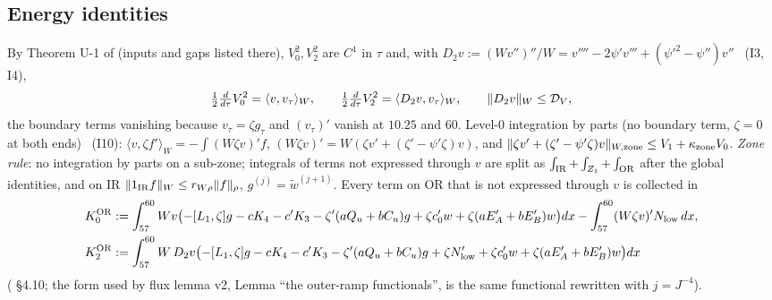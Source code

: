 \documentclass[11pt]{article}
\begin{document}
\subsection{Energy identities}\label{EI:sec:id}
By Theorem U-1 of  (inputs and gaps listed there), $V_0^2,V_2^2$ are $C^1$ in $\tau$ and, with $D_2v:=(Wv'')''/W=v''''-2\psi'v'''+(\psi'^2-\psi'')v''$ \tS\ (I3, I4),
\[
\tfrac12\tfrac{d}{d\tau}V_0^2=\langle v,v_\tau\rangle_W,\qquad\tfrac12\tfrac{d}{d\tau}V_2^2=\langle D_2v,v_\tau\rangle_W,\qquad\|D_2v\|_W\le\mathcal D_V ,
\]
the boundary terms vanishing because $v_\tau=\zeta g_\tau$ and $(v_\tau)'$ vanish at $10.25$ and $60$. Level-0 integration by parts (no boundary term, $\zeta=0$ at both ends) \tS\ (I10): $\langle v,\zeta f'\rangle_W=-\int(W\zeta v)'f$, $(W\zeta v)'=W(\zeta v'+(\zeta'-\psi'\zeta)v)$, and $\|\zeta v'+(\zeta'-\psi'\zeta)v\|_{W,\rm zone}\le V_1+\kappa_{\rm zone}V_0$. \emph{Zone rule}: no integration by parts on a sub-zone; integrals of terms not expressed through $v$ are split as $\int_{\rm IR}+\int_{Z_1}+\int_{\mathrm{OR}}$ after the global identities, and on IR $\|1_{\rm IR}f\|_W\le r_{W\rho}\|f\|_\rho$, $g^{(j)}=\tilde w^{(j+1)}$. Every term on OR that is not expressed through $v$ is collected in
\begin{align*}
K_0^{\mathrm{OR}}&:=\int_{57}^{60}Wv\bigl(-[L_1,\zeta]g-cK_4-c'K_3-\zeta'(aQ_u+bC_u)g+\zeta c_0'w+\zeta(aE_A'+bE_B')w\bigr)dx-\int_{57}^{60}(W\zeta v)'N_{\rm low}\,dx,\\
K_2^{\mathrm{OR}}&:=\int_{57}^{60}W\,D_2v\bigl(-[L_1,\zeta]g-cK_4-c'K_3-\zeta'(aQ_u+bC_u)g+\zeta N_{\rm low}'+\zeta c_0'w+\zeta(aE_A'+bE_B')w\bigr)dx
\end{align*}
( \S4.10; the form used by flux lemma v2,  Lemma ``the outer-ramp functionals'', is the same functional rewritten with $j=J^{-4}$).
\end{document}

